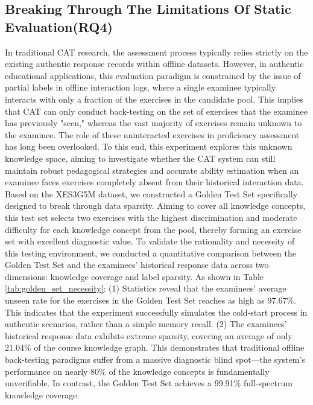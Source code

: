 \subsection{Breaking Through The Limitations Of Static Evaluation(RQ4)}
In traditional CAT research, the assessment process typically relies strictly on the existing authentic response records within offline datasets. However, in authentic educational applications, this evaluation paradigm is constrained by the issue of partial labels in offline interaction logs, where a single examinee typically interacts with only a fraction of the exercises in the candidate pool. This implies that CAT can only conduct back-testing on the set of exercises that the examinee has previously "seen," whereas the vast majority of exercises remain unknown to the examinee. The role of these uninteracted exercises in proficiency assessment has long been overlooked. To this end, this experiment explores this unknown knowledge space, aiming to investigate whether the CAT system can still maintain robust pedagogical strategies and accurate ability estimation when an examinee faces exercises completely absent from their historical interaction data. Based on the XES3G5M dataset, we constructed a Golden Test Set specifically designed to break through data sparsity. Aiming to cover all knowledge concepts, this test set selects two exercises with the highest discrimination and moderate difficulty for each knowledge concept from the pool, thereby forming an exercise set with excellent diagnostic value. To validate the rationality and necessity of this testing environment, we conducted a quantitative comparison between the Golden Test Set and the examinees' historical response data across two dimensions: knowledge coverage and label sparsity.
As shown in Table \ref{tab:golden_set_necessity}: (1) Statistics reveal that the examinees' average unseen rate  for the exercises in the Golden Test Set reaches as high as 97.67\%. This indicates that the experiment successfully simulates the cold-start process in authentic scenarios, rather than a simple memory recall.
(2) The examinees' historical response data exhibits extreme sparsity, covering an average of only 21.04\% of the course knowledge graph. This demonstrates that traditional offline back-testing paradigms suffer from a massive diagnostic blind spot—the system's performance on nearly 80\% of the knowledge concepts is fundamentally unverifiable. In contrast, the Golden Test Set achieves a 99.91\% full-spectrum knowledge coverage.



